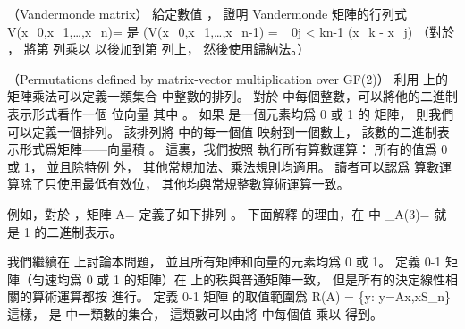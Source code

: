 \startsubject[
  title={Problems},
]

\startPROBLEM
（Vandermonde matrix）
給定數值 ，
證明 Vandermonde 矩陣的行列式
\startformula
V(x_0,x_1,\ldots,x_n)=
\stopformula
是
\startformula
\det(V(x_0,x_1,\ldots,x_{n-1}) = \prod_{0\le j < k\le n-1} (x_k - x_j)
\stopformula
（\hint 對於 ，
將第  列乘以  以後加到第  列上，
然後使用歸納法。）
\stopPROBLEM

\startANSWER
{}
\stopANSWER

\startPROBLEM
（Permutations defined by matrix-vector multiplication over GF(2)）
利用  上的矩陣乘法可以定義一類集合 \m{S_n=\{0,1,2,\ldots,2^n-1]\}} 中整數的排列。
對於  中每個整數，可以將他的二進制表示形式看作一個  位向量
\startformula
{}
\stopformula
其中 。
如果  是一個元素均爲 0 或 1 的  矩陣，
則我們可以定義一個排列。
該排列將  中的每一個值  映射到一個數上，
該數的二進制表示形式爲矩陣——向量積 。
這裏，我們按照  執行所有算數運算：
所有的值爲 0 或 1，
並且除特例  外，
其他常規加法、乘法規則均適用。
讀者可以認爲  算數運算除了只使用最低有效位，
其他均與常規整數算術運算一致。

例如，對於 ，矩陣
\startformula
A=\left[\startmatrix
\NC 1 \NC 0 \NR
\NC 1 \NC 1 \NR
\stopmatrix\right]
\stopformula
定義了如下排列 。
下面解釋  的理由，在  中
\startformula
\pi_A(3)=
\left[\startmatrix
\NC 1 \NC 0 \NR
\NC 1 \NC 1 \NR
\stopmatrix\right]
\left[\startmatrix
\NC 1 \NC 1 \NR
\stopmatrix\right]
\left[\startmatrix
\NC 1 \NR
\NC 0 \NR
\stopmatrix\right]
\stopformula
就是 1 的二進制表示。

我們繼續在  上討論本問題，
並且所有矩陣和向量的元素均爲 0 或 1。
定義 0-1 矩陣（勻速均爲 0 或 1 的矩陣）在  上的秩與普通矩陣一致，
但是所有的決定線性相關的算術運算都按  進行。
定義  0-1 矩陣  的取值範圍爲
\startformula
R(A) = \{y: y=Ax,x\in S_n\}
\stopformula
這樣，  是  中一類數的集合，
這類數可以由將  中每個值  乘以  得到。
\stopPROBLEM

\stopsubject%
